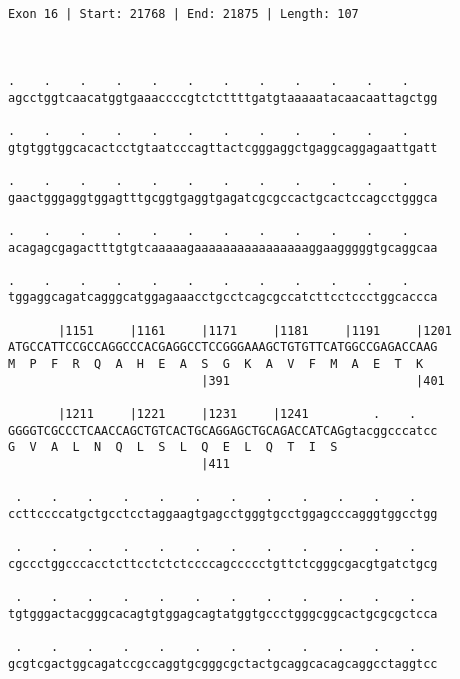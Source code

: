 \documentclass{article}
\begin{document}
\begin{Verbatim}
                      
 
Exon 16 | Start: 21768 | End: 21875 | Length: 107



.    .    .    .    .    .    .    .    .    .    .    .    
agcctggtcaacatggtgaaaccccgtctcttttgatgtaaaaatacaacaattagctgg
                                                            
.    .    .    .    .    .    .    .    .    .    .    .    
gtgtggtggcacactcctgtaatcccagttactcgggaggctgaggcaggagaattgatt
                                                            
.    .    .    .    .    .    .    .    .    .    .    .    
gaactgggaggtggagtttgcggtgaggtgagatcgcgccactgcactccagcctgggca
                                                            
.    .    .    .    .    .    .    .    .    .    .    .    
acagagcgagactttgtgtcaaaaagaaaaaaaaaaaaaaaaggaagggggtgcaggcaa
                                                            
.    .    .    .    .    .    .    .    .    .    .    .    
tggaggcagatcagggcatggagaaacctgcctcagcgccatcttcctccctggcaccca
                                                            
       |1151     |1161     |1171     |1181     |1191     |1201
ATGCCATTCCGCCAGGCCCACGAGGCCTCCGGGAAAGCTGTGTTCATGGCCGAGACCAAG
M  P  F  R  Q  A  H  E  A  S  G  K  A  V  F  M  A  E  T  K  
                           |391                          |401
  
       |1211     |1221     |1231     |1241         .    .   
GGGGTCGCCCTCAACCAGCTGTCACTGCAGGAGCTGCAGACCATCAGgtacggcccatcc
G  V  A  L  N  Q  L  S  L  Q  E  L  Q  T  I  S              
                           |411                             
  
 .    .    .    .    .    .    .    .    .    .    .    .   
ccttccccatgctgcctcctaggaagtgagcctgggtgcctggagcccagggtggcctgg
                                                            
 .    .    .    .    .    .    .    .    .    .    .    .   
cgccctggcccacctcttcctctctccccagccccctgttctcgggcgacgtgatctgcg
                                                            
 .    .    .    .    .    .    .    .    .    .    .    .   
tgtgggactacgggcacagtgtggagcagtatggtgccctgggcggcactgcgcgctcca
                                                            
 .    .    .    .    .    .    .    .    .    .    .    .   
gcgtcgactggcagatccgccaggtgcgggcgctactgcaggcacagcaggcctaggtcc
                                                            

\end{Verbatim}
\end{document}
